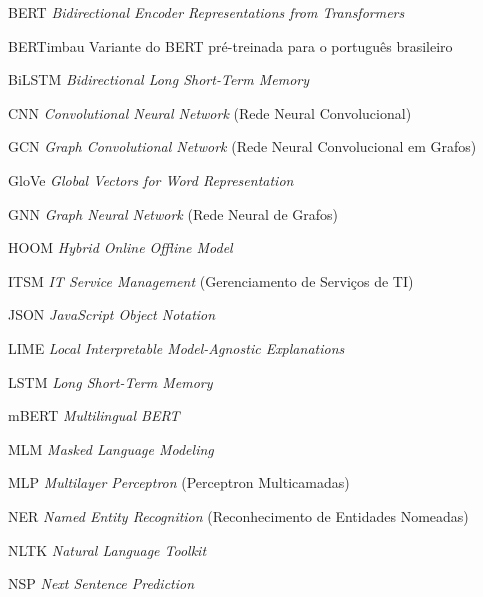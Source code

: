 \documentclass[
    12pt,                %
    openright,           %
    oneside,             %
    a4paper,             %
    english,             %
    brazil               %
]{abntex2}
\begin{document}
 \listoffigures*
 \cleardoublepage

 \listoftables*
 \cleardoublepage

\begin{siglas}
  \item[BERT] \textit{Bidirectional Encoder Representations from Transformers}
  \item[BERTimbau] Variante do BERT pré-treinada para o português brasileiro
  \item[BiLSTM] \textit{Bidirectional Long Short-Term Memory}
  \item[CNN] \textit{Convolutional Neural Network} (Rede Neural Convolucional)
  \item[GCN] \textit{Graph Convolutional Network} (Rede Neural Convolucional em Grafos)
  \item[GloVe] \textit{Global Vectors for Word Representation}
  \item[GNN] \textit{Graph Neural Network} (Rede Neural de Grafos)
  \item[HOOM] \textit{Hybrid Online Offline Model}
  \item[ITSM] \textit{IT Service Management} (Gerenciamento de Serviços de TI)
  \item[JSON] \textit{JavaScript Object Notation}
  \item[LIME] \textit{Local Interpretable Model-Agnostic Explanations}
  \item[LSTM] \textit{Long Short-Term Memory}
  \item[mBERT] \textit{Multilingual BERT}
  \item[MLM] \textit{Masked Language Modeling}
  \item[MLP] \textit{Multilayer Perceptron} (Perceptron Multicamadas)
  \item[NER] \textit{Named Entity Recognition} (Reconhecimento de Entidades Nomeadas)
  \item[NLTK] \textit{Natural Language Toolkit}
  \item[NSP] \textit{Next Sentence Prediction}

\end{siglas}
\end{document}
